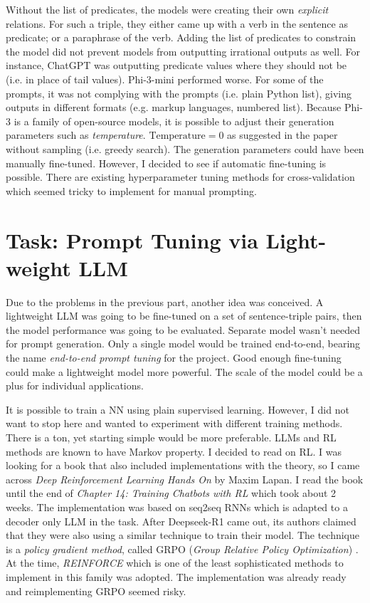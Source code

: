 \documentclass{article}
\begin{document}
Without the list of predicates, the models were creating their own \textit{explicit} relations. For such a triple, they either came up with a verb in the sentence as predicate; or a paraphrase of the verb. Adding the list of predicates to constrain the model did not prevent models from outputting irrational outputs as well. For instance, ChatGPT was outputting predicate values where they should not be (i.e. in place of tail values). Phi-3-mini performed worse. For some of the prompts, it was not complying with the prompts (i.e. plain Python list), giving outputs in different formats (e.g. markup languages, numbered list). Because Phi-3 is a family of open-source models, it is possible to adjust their generation parameters such as \textit{temperature}. $\text{Temperature}=0$ as suggested in the paper without sampling (i.e. greedy search). The generation parameters could have been manually fine-tuned. However, I decided to see if automatic fine-tuning is possible. There are existing hyperparameter tuning methods for cross-validation which seemed tricky to implement for manual prompting. 

\section{Task: Prompt Tuning via Light-weight LLM}

Due to the problems in the previous part, another idea was conceived. A lightweight LLM was going to be fine-tuned on a set of sentence-triple pairs, then the model performance was going to be evaluated. Separate model wasn't needed for prompt generation. Only a single model would be trained end-to-end, bearing the name \textit{end-to-end prompt tuning} for the project. Good enough fine-tuning could make a lightweight model more powerful. The scale of the model could be a plus for individual applications.

It is possible to train a NN using plain supervised learning. However, I did not want to stop here and wanted to experiment with different training methods. There is a ton, yet starting simple would be more preferable. LLMs and RL methods are known to have Markov property. I decided to read on RL. I was looking for a book that also included implementations with the theory, so I came across \textit{Deep Reinforcement Learning Hands On} by Maxim Lapan. I read the book until the end of \textit{Chapter 14: Training Chatbots with RL} which took about 2 weeks. The implementation was based on seq2seq RNNs which is adapted to a decoder only LLM in the task. After Deepseek-R1 came out, its authors claimed that they were also using a similar technique to train their model. The technique is a \textit{policy gradient method}, called GRPO (\textit{Group
Relative Policy Optimization}) \cite{deepseek-ai_deepseek-r1_2025, shao_deepseekmath_2024, schulman_proximal_2017}. At the time, \textit{REINFORCE} which is one of the least sophisticated methods to implement in this family was adopted. The implementation was already ready and reimplementing GRPO seemed risky.
\end{document}
